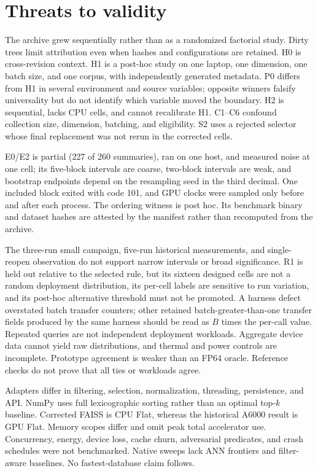 \documentclass[10pt]{article}
\begin{document}
\section{Threats to validity}
The archive grew sequentially rather than as a randomized factorial study. Dirty trees limit attribution even when hashes and configurations are retained. H0 is cross-revision context. H1 is a post-hoc study on one laptop, one dimension, one batch size, and one corpus, with independently generated metadata. P0 differs from H1 in several environment and source variables; opposite winners falsify universality but do not identify which variable moved the boundary. H2 is sequential, lacks CPU cells, and cannot recalibrate H1. C1--C6 confound collection size, dimension, batching, and eligibility. S2 uses a rejected selector whose final replacement was not rerun in the corrected cells.

E0/E2 is partial (227 of 260 summaries), ran on one host, and measured noise at one cell; its five-block intervals are coarse, two-block intervals are weak, and bootstrap endpoints depend on the resampling seed in the third decimal. One included block exited with code 101, and GPU clocks were sampled only before and after each process. The ordering witness is post hoc. Its benchmark binary and dataset hashes are attested by the manifest rather than recomputed from the archive.

The three-run small campaign, five-run historical measurements, and single-reopen observation do not support narrow intervals or broad significance. R1 is held out relative to the selected rule, but its sixteen designed cells are not a random deployment distribution, its per-cell labels are sensitive to run variation, and its post-hoc alternative threshold must not be promoted. A harness defect overstated batch transfer counters; other retained batch-greater-than-one transfer fields produced by the same harness should be read as $B$ times the per-call value. Repeated queries are not independent deployment workloads. Aggregate device data cannot yield raw distributions, and thermal and power controls are incomplete. Prototype agreement is weaker than an FP64 oracle. Reference checks do not prove that all ties or workloads agree.

Adapters differ in filtering, selection, normalization, threading, persistence, and API. NumPy uses full lexicographic sorting rather than an optimal top-$k$ baseline. Corrected FAISS is CPU Flat, whereas the historical A6000 result is GPU Flat. Memory scopes differ and omit peak total accelerator use. Concurrency, energy, device loss, cache churn, adversarial predicates, and crash schedules were not benchmarked. Native sweeps lack ANN frontiers and filter-aware baselines. No fastest-database claim follows.
\end{document}
